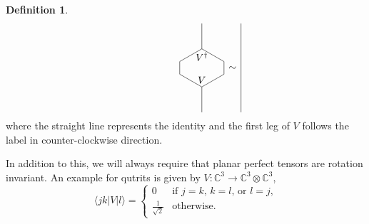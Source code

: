\documentclass[11pt,oneside]{amsart}
\theoremstyle{plain}%
\theoremstyle{definition}
\newtheorem{definition}{Definition}[section]
\theoremstyle{remark}
\begin{document}
\begin{definition}
\begin{equation}
\begin{tikzpicture}[scale=0.6,baseline=-3mm]
		\end{tikzpicture}\mspace{90mu}
		\begin{tikzpicture}[scale=0.6,baseline=-3mm]
			\draw (0, 0.5*\x) -- (0, 1.5*\x);
			\draw (0, 0.5*\x) -- (-1.5/1.73205*\x, 0) -- ++(0, -0.5*\x);
			\draw (0, 0.5*\x) -- (1.5/1.73205*\x, 0) -- ++(0, -0.5*\x);
			\node[below] at (0, 0.5*\x) {$V^\dag$};
			\begin{scope}[yscale=-1, yshift=0.5*\x cm]
				\draw (0, 0.5*\x) -- (0, 1.5*\x);
				\draw (0, 0.5*\x) -- (-1.5/1.73205*\x, 0);
				\draw (0, 0.5*\x) -- (1.5/1.73205*\x, 0);
				\node[above] at (0, 0.5*\x) {$V$};
			\end{scope}
		\end{tikzpicture}\,\sim\,
		\begin{tikzpicture}[scale=0.6,baseline=-3mm]
			\draw (0, -2*\x) -- (0, 1.5*\x);
		\end{tikzpicture}
	\end{equation}
	where the straight line represents the identity and the first leg of $V$ follows the label in counter-clockwise direction.
\end{definition}

In addition to this, we will always require that planar perfect tensors are rotation invariant. An example for qutrits is given by $V\colon\mathbb{C}^3\to\mathbb{C}^3\otimes\mathbb{C}^3$,
\begin{equation}\label{eq:perfect-example}
	\langle jk|V|l\rangle = \begin{cases}
		0 & \text{if $j=k$, $k=l$, or $l=j$,}\\
		\frac{1}{\sqrt{2}} & \text{otherwise.}
	\end{cases}
\end{equation}
\end{document}
